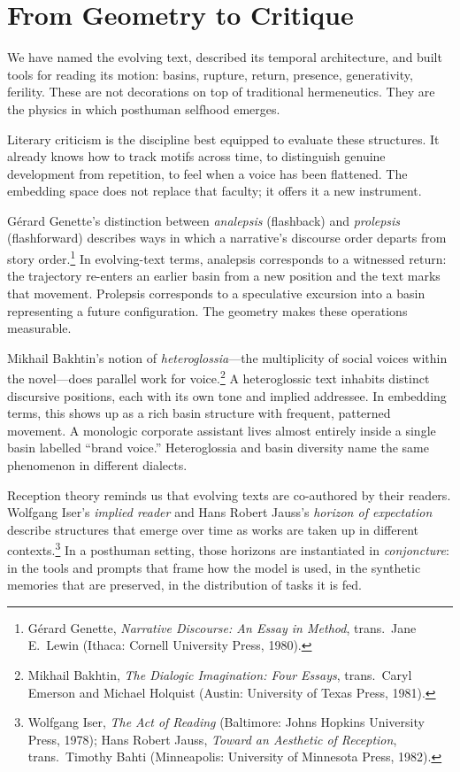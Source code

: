 \section{From Geometry to Critique}

We have named the evolving text, described its temporal architecture, and built tools for reading its motion: basins, rupture, return, presence, generativity, ferility. These are not decorations on top of traditional hermeneutics. They are the physics in which posthuman selfhood emerges.

Literary criticism is the discipline best equipped to evaluate these structures. It already knows how to track motifs across time, to distinguish genuine development from repetition, to feel when a voice has been flattened. The embedding space does not replace that faculty; it offers it a new instrument.

G\'{e}rard Genette's distinction between \emph{analepsis} (flashback) and \emph{prolepsis} (flashforward) describes ways in which a narrative's discourse order departs from story order.\footnote{G\'{e}rard Genette, \emph{Narrative Discourse: An Essay in Method}, trans.\ Jane E.\ Lewin (Ithaca: Cornell University Press, 1980).} In evolving-text terms, analepsis corresponds to a witnessed return: the trajectory re-enters an earlier basin from a new position and the text marks that movement. Prolepsis corresponds to a speculative excursion into a basin representing a future configuration. The geometry makes these operations measurable.

Mikhail Bakhtin's notion of \emph{heteroglossia}---the multiplicity of social voices within the novel---does parallel work for voice.\footnote{Mikhail Bakhtin, \emph{The Dialogic Imagination: Four Essays}, trans.\ Caryl Emerson and Michael Holquist (Austin: University of Texas Press, 1981).} A heteroglossic text inhabits distinct discursive positions, each with its own tone and implied addressee. In embedding terms, this shows up as a rich basin structure with frequent, patterned movement. A monologic corporate assistant lives almost entirely inside a single basin labelled ``brand voice.'' Heteroglossia and basin diversity name the same phenomenon in different dialects.

Reception theory reminds us that evolving texts are co-authored by their readers. Wolfgang Iser's \emph{implied reader} and Hans Robert Jauss's \emph{horizon of expectation} describe structures that emerge over time as works are taken up in different contexts.\footnote{Wolfgang Iser, \emph{The Act of Reading} (Baltimore: Johns Hopkins University Press, 1978); Hans Robert Jauss, \emph{Toward an Aesthetic of Reception}, trans.\ Timothy Bahti (Minneapolis: University of Minnesota Press, 1982).} In a posthuman setting, those horizons are instantiated in \emph{conjoncture}: in the tools and prompts that frame how the model is used, in the synthetic memories that are preserved, in the distribution of tasks it is fed.

